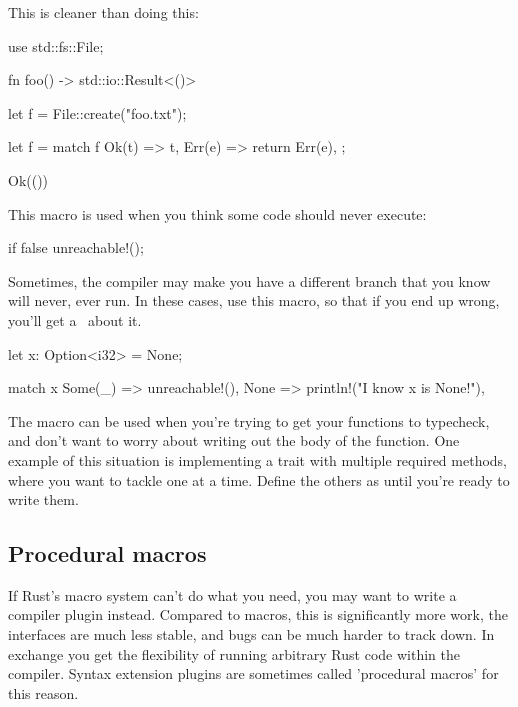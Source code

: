 This is cleaner than doing this:

\begin{rustc}
use std::fs::File;

fn foo() -> std::io::Result<()> {
    let f = File::create("foo.txt");

    let f = match f {
        Ok(t) => t,
        Err(e) => return Err(e),
    };

    Ok(())
}
\end{rustc}


This macro is used when you think some code should never execute:

\begin{rustc}
if false {
    unreachable!();
}
\end{rustc}

Sometimes, the compiler may make you have a different branch that you know will never, ever run. In these cases, use this macro, so 
that if you end up wrong, you'll get a \panic\ about it.

\begin{rustc}
let x: Option<i32> = None;

match x {
    Some(_) => unreachable!(),
    None => println!("I know x is None!"),
}
\end{rustc}


The  macro can be used when you're trying to get your functions to typecheck, and don't want to worry about writing 
out the body of the function. One example of this situation is implementing a trait with multiple required methods, where you want to tackle 
one at a time. Define the others as  until you're ready to write them.

\subsection*{Procedural macros}

If Rust's macro system can't do what you need, you may want to write a compiler plugin instead. Compared to  macros, 
this is significantly more work, the interfaces are much less stable, and bugs can be much harder to track down. In exchange you get the 
flexibility of running arbitrary Rust code within the compiler. Syntax extension plugins are sometimes called 'procedural macros' for 
this reason.

